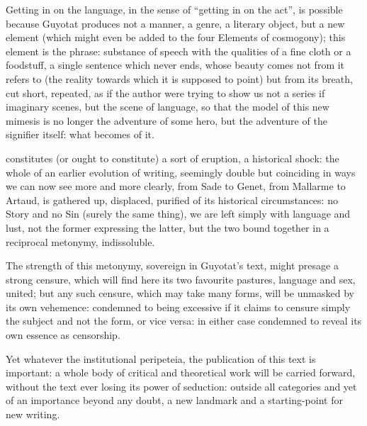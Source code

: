 \documentclass[10pt,twoside]{memoir}
\begin{document}
Getting in on the language, in the sense of \enquote{getting in on the act}, is possible because
Guyotat produces not a manner, a genre, a literary object, but a new element (which might even be
added to the four Elements of cosmogony); this element is the phrase: substance of speech with the
qualities of a fine cloth or a foodstuff, a single sentence which never ends, whose beauty comes not
from it refers to (the reality towards which it is supposed to point) but from its breath, cut
short, repeated, as if the author were trying to show us not a series if imaginary scenes, but the
scene of language, so that the model of this new mimesis is no longer the adventure of some hero,
but the adventure of the signifier itself: what becomes of it.

 constitutes (or ought to constitute) a sort of eruption, a historical
shock: the whole of an earlier evolution of writing, seemingly double but coinciding in ways we can
now see more and more clearly, from Sade to Genet, from Mallarme to Artaud, is gathered up,
displaced, purified of its historical circumstances: no Story and no Sin (surely the same thing), we
are left simply with language and lust, not the former expressing the latter, but the two bound
together in a reciprocal metonymy, indissoluble.

The strength of this metonymy, sovereign in Guyotat's text, might presage a strong censure, which
will find here its two favourite pastures, language and sex, united; but any such censure, which may
take many forms, will be unmasked by its own vehemence: condemned to being excessive if it claims to
censure simply the subject and not the form, or vice versa: in either case condemned to reveal its
own essence as censorship.

Yet whatever the institutional peripeteia, the publication of this text is important: a whole body
of critical and theoretical work will be carried forward, without the text ever losing its power of
seduction: outside all categories and yet of an importance beyond any doubt, a new landmark and a
starting-point for new writing.


\mainmatter

\clearpage
\pagestyle{simple}

\thispagestyle{empty}




% 
\end{document}
